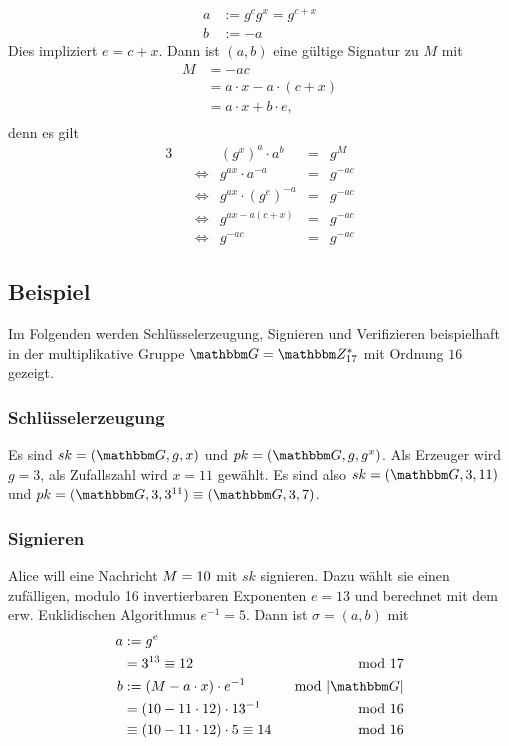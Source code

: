\begin{description}
\begin{align*}
	a &:= g^cg^x = g^{c+x}\\
	b &:= -a
	\end{align*}
        Dies impliziert $e=c+x$. 
	Dann ist $(a, b)$ eine gültige Signatur zu $M$ mit
	\begin{align*}
          M &= -ac\\
            &= a \cdot x - a \cdot (c + x)\\
            &= a \cdot x + b \cdot e,\\
	\end{align*}
        denn es gilt 
        \begin{alignat*}{3}
          &&                 & (g^x)^a\cdot a^b       &= &g^M\\
          && \Leftrightarrow & g^{ax} \cdot a^{-a}     &= &g^{-ac}\\
          && \Leftrightarrow & g^{ax} \cdot (g^e)^{-a} &= &g^{-ac}\\
          && \Leftrightarrow & g^{ax-a(c+x)}            &= &g^{-ac}\\
          && \Leftrightarrow & g^{-ac}                 &= &g^{-ac}
        \end{alignat*}
      \end{description}
      \subsection{Beispiel}
      Im Folgenden werden Schlüsselerzeugung, Signieren und Verifizieren beispielhaft
      in der multiplikative Gruppe $\G = \Z{17}^{*}$ mit Ordnung $16$ gezeigt. 
      \subsubsection*{Schlüsselerzeugung}
      Es sind $\skey = (\G, g, x)$ und $\pkey = (\G, g, g^x)$. Als
      Erzeuger wird $g=3$, als Zufallszahl wird $x=11$
      gewählt. Es sind also $\skey = (\G, 3, 11)$ und $\pkey = (\G, 3,
      3^{11})\equiv (\G, 3, 7)$.
      \subsubsection*{Signieren}
      Alice will eine Nachricht $M = 10$ mit $sk$ signieren. Dazu
      wählt sie einen zufälligen, modulo 16 invertierbaren Exponenten
      $e= 13$ und berechnet mit dem erw. Euklidischen Algorithmus
      $e^{-1}=5$. Dann ist $\sigma =  (a, b)$ mit 
      \begin{align*}
       a &:= g^e &\\
         &= 3^{13} \equiv 12 & \mod 17\\
       b &:= (\plaint-a  \cdot x) \cdot e^{-1} & \mod |\G|\\
          &= (10 - 11 \cdot 12) \cdot 13^{-1} & \mod 16\\
          &\equiv (10 - 11\cdot 12) \cdot 5 \equiv 14 & \mod 16
      \end{align*}
